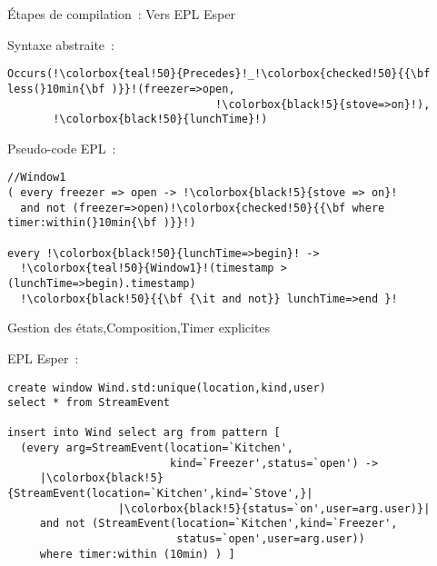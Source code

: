 \begin{frame}[fragile]{Étapes de compilation~: Vers EPL Esper}
  \begin{minipage}{.45\linewidth}
      \begin{coloredbox}[black]{\tiny Syntaxe abstraite~:}

      \begin{lstlisting}[language=Maloya,basicstyle=\ttfamily\tiny,escapechar=!]
Occurs(!\colorbox{teal!50}{Precedes}!_!\colorbox{checked!50}{{\bf less(}10min{\bf )}}!(freezer=>open,
                                !\colorbox{black!5}{stove=>on}!),
       !\colorbox{black!50}{lunchTime}!)
        \end{lstlisting}
\end{coloredbox}
\vfill
        \begin{coloredbox}[black]{\tiny Pseudo-code EPL~:}
      \begin{lstlisting}[language=EPLPseudoCode,basicstyle=\ttfamily\tiny,escapechar=!]
//Window1
( every freezer => open -> !\colorbox{black!5}{stove => on}! 
  and not (freezer=>open)!\colorbox{checked!50}{{\bf where timer:within(}10min{\bf )}}!) 

every !\colorbox{black!50}{lunchTime=>begin}! ->
  !\colorbox{teal!50}{Window1}!(timestamp > (lunchTime=>begin).timestamp)
  !\colorbox{black!50}{{\bf {\it and not}} lunchTime=>end }!
      \end{lstlisting}
\end{coloredbox}
  \end{minipage}
\hfill
\begin{minipage}{.52\linewidth}
   \begin{tiny}
    \colorbox{black!50}{Gestion des états},\colorbox{teal!50}{Composition},\colorbox{checked!50}{Timer explicites}
  \end{tiny}
  \begin{coloredbox}[black]{\tiny EPL Esper~:}
     \begin{lstlisting}[language=EPL,basicstyle=\ttfamily\tiny,escapechar=|]
create window Wind.std:unique(location,kind,user) 
select * from StreamEvent 

insert into Wind select arg from pattern [ 
  (every arg=StreamEvent(location=`Kitchen',
                         kind=`Freezer',status=`open') ->
     |\colorbox{black!5}{StreamEvent(location=`Kitchen',kind=`Stove',}|
                 |\colorbox{black!5}{status=`on',user=arg.user)}|
     and not (StreamEvent(location=`Kitchen',kind=`Freezer',
                          status=`open',user=arg.user)) 
     where timer:within (10min) ) ]


\end{lstlisting}
\end{coloredbox}
\end{minipage}
\end{frame}
